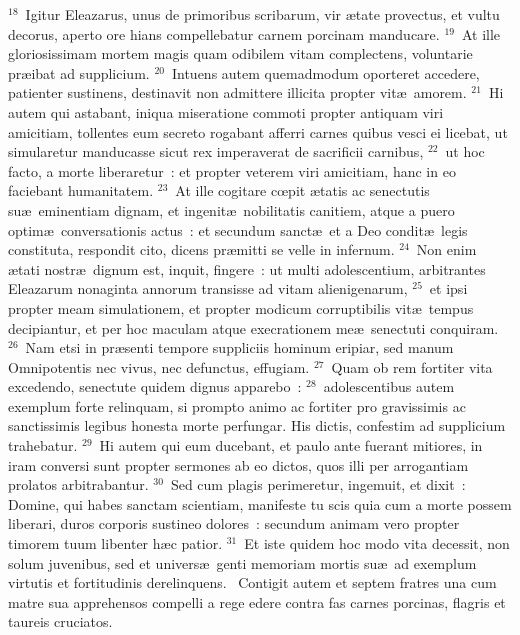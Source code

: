 ${}^{18}$~Igitur Eleazarus, unus de primoribus scribarum, vir \ae tate provectus, et vultu decorus, aperto ore hians compellebatur carnem porcinam manducare.
${}^{19}$~At ille gloriosissimam mortem magis quam odibilem vitam complectens, voluntarie pr\ae ibat ad supplicium.
${}^{20}$~Intuens autem quemadmodum oporteret accedere, patienter sustinens, destinavit non admittere illicita propter vit\ae\ amorem.
${}^{21}$~Hi autem qui astabant, iniqua miseratione commoti propter antiquam viri amicitiam, tollentes eum secreto rogabant afferri carnes quibus vesci ei licebat, ut simularetur manducasse sicut rex imperaverat de sacrificii carnibus,
${}^{22}$~ut hoc facto, a morte liberaretur~: et propter veterem viri amicitiam, hanc in eo faciebant humanitatem.
${}^{23}$~At ille cogitare cœpit \ae tatis ac senectutis su\ae\ eminentiam dignam, et ingenit\ae\ nobilitatis canitiem, atque a puero optim\ae\ conversationis actus~: et secundum sanct\ae\ et a Deo condit\ae\ legis constituta, respondit cito, dicens pr\ae mitti se velle in infernum.
${}^{24}$~Non enim \ae tati nostr\ae\ dignum est, inquit, fingere~: ut multi adolescentium, arbitrantes Eleazarum nonaginta annorum transisse ad vitam alienigenarum,
${}^{25}$~et ipsi propter meam simulationem, et propter modicum corruptibilis vit\ae\ tempus decipiantur, et per hoc maculam atque execrationem me\ae\ senectuti conquiram.
${}^{26}$~Nam etsi in pr\ae senti tempore suppliciis hominum eripiar, sed manum Omnipotentis nec vivus, nec defunctus, effugiam.
${}^{27}$~Quam ob rem fortiter vita excedendo, senectute quidem dignus apparebo~:
${}^{28}$~adolescentibus autem exemplum forte relinquam, si prompto animo ac fortiter pro gravissimis ac sanctissimis legibus honesta morte perfungar. His dictis, confestim ad supplicium trahebatur.
${}^{29}$~Hi autem qui eum ducebant, et paulo ante fuerant mitiores, in iram conversi sunt propter sermones ab eo dictos, quos illi per arrogantiam prolatos arbitrabantur.
${}^{30}$~Sed cum plagis perimeretur, ingemuit, et dixit~: Domine, qui habes sanctam scientiam, manifeste tu scis quia cum a morte possem liberari, duros corporis sustineo dolores~: secundum animam vero propter timorem tuum libenter h\ae c patior.
${}^{31}$~Et iste quidem hoc modo vita decessit, non solum juvenibus, sed et univers\ae\ genti memoriam mortis su\ae\ ad exemplum virtutis et fortitudinis derelinquens.
~\lettrine[lines=10,image=true,loversize=0.05,lraise=-0.03]{C}{}ontigit autem et septem fratres una cum matre sua apprehensos compelli a rege edere contra fas carnes porcinas, flagris et taureis cruciatos.
